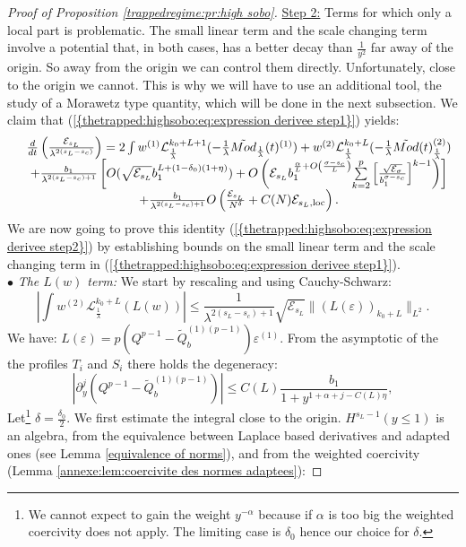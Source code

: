\documentclass[11pt,a4paper,reqno]{amsart}
\theoremstyle{remark}
\numberwithin{equation}{section}
\begin{document}
\begin{proof}[Proof of Proposition \ref{trappedregime:pr:high sobo}]
\underline{Step 2:} Terms for which only a local part is problematic. The small linear term and the scale changing term involve a potential that, in both cases, has a better decay than $\frac{1}{y^2}$ far away of the origin. So away from the origin we can control them directly. Unfortunately, close to the origin we cannot. This is why we will have to use an additional tool, the study of a Morawetz type quantity, which will be done in the next subsection. We claim that {{\rm (\ref{{thetrapped:highsobo:eq:expression derivee step1}})}} yields:
\begin{equation} \label{thetrapped:highsobo:eq:expression derivee step2}
\begin{array}{r c l}
&\frac{d}{dt}\left( \frac{\mathcal{E}_{s_L}}{\lambda^{2(s_L-s_c)}} \right) = 2\int w^{(1)}\mathcal{L}_{\frac{1}{\lambda}}^{k_0+L+1} ( -\frac{1}{\lambda} \tilde{Mod}_{\frac{1}{\lambda}}(t)^{(1)})+w^{(2)}\mathcal{L}_{\frac{1}{\lambda}}^{k_0+L} ( -\frac{1}{\lambda} \tilde{Mod}(t)_{\frac{1}{\lambda}}^{(2)})\\
&+\frac{b_1}{\lambda^{2(s_L-s_c)+1}} \left[O(\sqrt{\mathcal{E}_{s_L}}b_1^{L+(1-\delta_0)(1+\eta)})+O\left(\mathcal{E}_{s_L}b_1^{\frac{\alpha}{L}+O\left( \frac{\sigma-s_c}{L} \right)}\underset{k=2}{\overset{p}{\sum}} \left[\frac{\sqrt{\mathcal{E}_{\sigma}}}{b_1^{\sigma-s_c}} \right]^{k-1}\right)\right]\\
&+\frac{b_1}{\lambda^{2(s_L-s_c)+1}}O\left( \frac{\mathcal{E}_{s_L}}{N^{\delta}}+C(N)\mathcal{E}_{s_L,\text{loc}} \right) .
\end{array}
\end{equation}
We are now going to prove this identity {{\rm (\ref{{thetrapped:highsobo:eq:expression derivee step2}})}} by establishing bounds on the small linear term and the scale changing term in {{\rm (\ref{{thetrapped:highsobo:eq:expression derivee step1}})}}.\\
$\bullet$ \emph{The $L(w)$ term:} We start by rescaling and using Cauchy-Schwarz:
$$
\left| \int w^{(2)} \mathcal{L}_{\frac{1}{\lambda}}^{k_0+L}(L(w))\right| \leq \frac{1}{\lambda^{2(s_L-s_c)+1}} \sqrt{\mathcal{E}_{s_L}} \parallel (L(\varepsilon))_{k_0+L}\parallel_{L^2} .
$$
We have: $L(\varepsilon)=p(Q^{p-1}-\tilde{Q}_b^{(1)(p-1)})\varepsilon^{(1)}$. From the asymptotic of the the profiles $T_i$ and $S_i$ there holds the degeneracy:
$$
|\partial_y^j (Q^{p-1}-\tilde{Q}_b^{(1)(p-1)})| \leq C(L) \frac{b_1}{1+y^{1+\alpha+j-C(L)\eta}} ,
$$
Let\footnote{We cannot expect to gain the weight $y^{-\alpha}$ because if $\alpha$ is too big the weighted coercivity does not apply. The limiting case is $\delta_0$ hence our choice for $\delta$.} $\delta=\frac{\delta_0}{2}$. We first estimate the integral close to the origin. $H^{s_L-1}(y\leq 1)$ is an algebra, from the equivalence between Laplace based derivatives and adapted ones (see Lemma \ref{equivalence of norms}), and from the weighted coercivity (Lemma \ref{annexe:lem:coercivite des normes adaptees}):

\end{proof}
\end{document}
